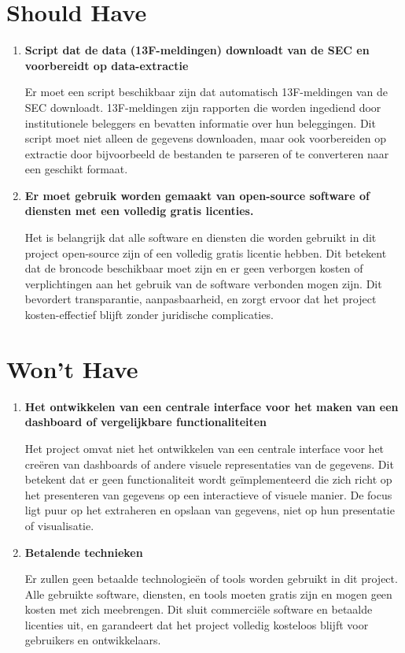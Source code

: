 \section{Should Have}

\begin{enumerate}
    \item \textbf{Script dat de data (13F-meldingen) downloadt van de SEC en voorbereidt op data-extractie}

         Er moet een script beschikbaar zijn dat automatisch 13F-meldingen van de SEC downloadt. 13F-meldingen zijn rapporten die worden ingediend door institutionele beleggers en bevatten informatie over hun beleggingen. Dit script moet niet alleen de gegevens downloaden, maar ook voorbereiden op extractie door bijvoorbeeld de bestanden te parseren of te converteren naar een geschikt formaat.

    
    
    \item \textbf{Er moet gebruik worden gemaakt van open-source software of diensten met een volledig gratis licenties.}

         Het is belangrijk dat alle software en diensten die worden gebruikt in dit project open-source zijn of een volledig gratis licentie hebben. Dit betekent dat de broncode beschikbaar moet zijn en er geen verborgen kosten of verplichtingen aan het gebruik van de software verbonden mogen zijn. Dit bevordert transparantie, aanpasbaarheid, en zorgt ervoor dat het project kosten-effectief blijft zonder juridische complicaties.

\end{enumerate}

\section{Won't Have}

\begin{enumerate}
    \item \textbf{Het ontwikkelen van een centrale interface voor het maken van een dashboard of vergelijkbare functionaliteiten}

         Het project omvat niet het ontwikkelen van een centrale interface voor het creëren van dashboards of andere visuele representaties van de gegevens. Dit betekent dat er geen functionaliteit wordt geïmplementeerd die zich richt op het presenteren van gegevens op een interactieve of visuele manier. De focus ligt puur op het extraheren en opslaan van gegevens, niet op hun presentatie of visualisatie.

    
    \item \textbf{Betalende technieken}

         Er zullen geen betaalde technologieën of tools worden gebruikt in dit project. Alle gebruikte software, diensten, en tools moeten gratis zijn en mogen geen kosten met zich meebrengen. Dit sluit commerciële software en betaalde licenties uit, en garandeert dat het project volledig kosteloos blijft voor gebruikers en ontwikkelaars.

\end{enumerate}


